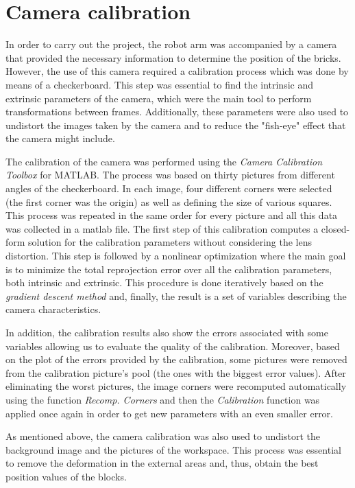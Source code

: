 \section{Camera calibration}\label{ch:calibration}

In order to carry out the project, the robot arm was accompanied by a camera that provided the necessary information to determine the position of the bricks. However, the use of this camera required a calibration process which was done by means of a checkerboard. This step was essential to find the intrinsic and extrinsic parameters of the camera, which were the main tool to perform transformations between frames. Additionally, these parameters were also used to undistort the images taken by the camera and to reduce the "fish-eye" effect that the camera might include.

The calibration of the camera was performed using the \textit{Camera Calibration Toolbox} for MATLAB. The process was based on thirty pictures from different angles of the checkerboard. In each image, four different corners were selected (the first corner was the origin) as well as defining the size of various squares. This process was repeated in the same order for every picture and all this data was collected in a matlab file. The first step of this calibration computes a closed-form solution for the calibration parameters without considering the lens distortion. This step is followed by a nonlinear optimization where the main goal is to minimize the total reprojection error over all the calibration parameters, both intrinsic and extrinsic. This procedure is done iteratively based on the \textit{gradient descent method} and, finally, the result is a set of variables describing the camera characteristics. 

In addition, the calibration results also show the errors associated with some variables allowing us to evaluate the quality of the calibration. Moreover, based on the plot of the errors provided by the calibration, some pictures were removed from the calibration picture's pool (the ones with the biggest error values). After eliminating the worst pictures, the image corners were recomputed automatically using the function \textit{Recomp. Corners} and then the \textit{Calibration} function was applied once again in order to get new parameters with an even smaller error.

As mentioned above, the camera calibration was also used to undistort the background image and the pictures of the workspace. This process was essential to remove the deformation in the external areas and, thus, obtain the best position values of the blocks. \par


